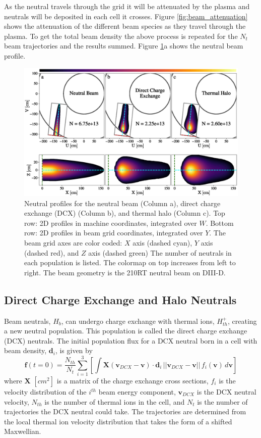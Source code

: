 As the neutral travels through the grid it will be attenuated by the plasma and neutrals will be deposited in each cell it crosses. Figure \ref{fig:beam_attenuation} shows the attenuation of the different beam species as they travel through the plasma. To get the total beam density the above process is repeated for the $N_t$ beam trajectories and the results summed. Figure \ref{fig:beam_density}a shows the neutral beam profile.
\begin{figure}[h!]
    \centering
    \includegraphics[width=16cm]{figures/beam_density.eps}
    \caption{Neutral profiles for the neutral beam (Column a), direct charge exchange (DCX) (Column b), and thermal halo (Column c). Top row: 2D profiles in machine coordinates, integrated over $W$. Bottom row: 2D profiles in beam grid coordinates, integrated over $Y$. The beam grid axes are color coded: $X$ axis (dashed cyan), $Y$ axis (dashed red), and $Z$ axis (dashed green) The number of neutrals in each population is listed. The colormap on top increases from left to right. The beam geometry is the 210RT neutral beam on DIII-D.}
    \label{fig:beam_density}
\end{figure}

\subsection{Direct Charge Exchange and Halo Neutrals}
Beam neutrals, $H_b$, can undergo charge exchange with thermal ions, $H_{th}^+$, creating a new neutral population. This population is called the direct charge exchange (DCX) neutrals. The initial population flux for a DCX neutral born in a cell with beam density, $\mathbf{d}_i$, is given by
\begin{equation} \label{eq:dcx_rates}
    \mathbf{f}(t=0) = \frac{N_{th}}{N_{t}}\sum_{i=1}^3 \left [ \int \mathbf{X}(\mathbf{v}_{DCX} - \mathbf{v}) \cdot \mathbf{d}_i\, ||\mathbf{v}_{DCX} - \mathbf{v}||\, f_i(\mathbf{v})\, d\mathbf{v} \right ]
\end{equation}
where $\mathbf{X}$ $[cm^2]$ is a matrix of the charge exchange cross sections, $f_i$ is the velocity distribution of the $i^{th}$ beam energy component, $\mathbf{v}_{DCX}$ is the DCX neutral velocity, $N_{th}$ is the number of thermal ions in the cell, and $N_{t}$ is the number of trajectories the DCX neutral could take. The trajectories are determined from the local thermal ion velocity distribution that takes the form of a shifted Maxwellian.

